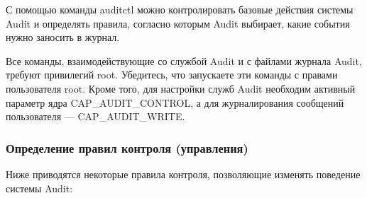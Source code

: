 \documentclass[a4paper,10pt,twoside]{article}
\begin{document}
С помощью команды auditctl можно контролировать базовые действия системы Audit и определять правила, согласно которым Audit выбирает, какие события нужно заносить в журнал.


Все команды, взаимодействующие со службой Audit и с файлами журнала Audit, требуют привилегий root. Убедитесь, что запускаете эти команды с правами пользователя root. Кроме того, для настройки служб Audit необходим активный параметр ядра  CAP\_AUDIT\_CONTROL, а для журналирования сообщений пользователя — CAP\_AUDIT\_WRITE.


\subsubsection{Определение правил контроля (управления)}
Ниже приводятся некоторые правила контроля, позволяющие изменять поведение системы Audit: 
\end{document}
